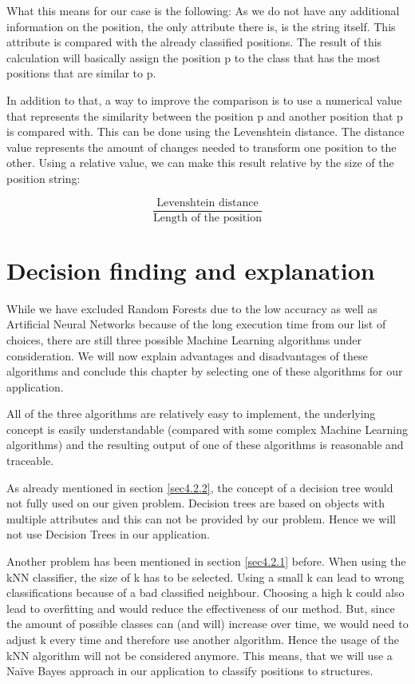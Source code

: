 What this means for our case is the following: As we do not have any additional information on the position, the only attribute there is, is the string itself. This attribute is compared with the already classified positions. The result of this calculation will basically assign the position p to the class that has the most positions that are similar to p.

In addition to that, a way to improve the comparison is to use a numerical value that represents the similarity between the position p and another position that p is compared with. This can be done using the Levenshtein distance. The distance value represents the amount of changes needed to transform one position to the other. Using a relative value, we can make this result relative by the size of the position string:

\[
\frac {\text{Levenshtein distance}}{\text{Length of the position}}
\]

\section{Decision finding and explanation}
\label{sec4.3}

While we have excluded Random Forests due to the low accuracy as well as Artificial Neural Networks because of the long execution time from our list of choices, there are still three possible Machine Learning algorithms under consideration. We will now explain advantages and disadvantages of these algorithms and conclude this chapter by selecting one of these algorithms for our application.

All of the three algorithms are relatively easy to implement, the underlying concept is easily understandable (compared with some complex Machine Learning algorithms) and the resulting output of one of these algorithms is reasonable and traceable. 

As already mentioned in section \ref{sec4.2.2}, the concept of a decision tree would not fully used on our given problem. Decision trees are based on objects with multiple attributes and this can not be provided by our problem. Hence we will not use Decision Trees in our application.

Another problem has been mentioned in section \ref{sec4.2.1} before. When using the kNN classifier, the size of k has to be selected. Using a small k can lead to wrong classifications because of a bad classified neighbour. Choosing a high k could also lead to overfitting and would reduce the effectiveness of our method. But, since the amount of possible classes can (and will) increase over time, we would need to adjust k every time and therefore use another algorithm. Hence the usage of the kNN algorithm will not be considered anymore.
This means, that we will use a Na{\"i}ve Bayes approach in our application to classify positions to structures. 